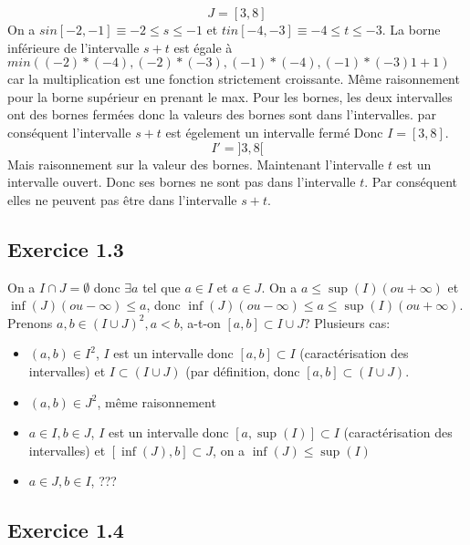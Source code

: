 \documentclass[]{book}
\theoremstyle{definition}
\begin{document}
$$J=[3,8]$$
On a $s in [-2,-1] \equiv -2 \leq s \leq -1$ et $t in [-4,-3] \equiv -4 \leq t \leq -3$. La borne inf\'erieure de l'intervalle $s+t$ est \'egale \`a $min((-2)*(-4), (-2)*(-3), (-1)*(-4), (-1)*(-3)1+1)$ car la multiplication est une fonction strictement croissante. M\^eme raisonnement pour la borne sup\'erieur en prenant le max. Pour les bornes, les deux intervalles ont des bornes ferm\'ees donc la valeurs des bornes sont dans l'intervalles. par cons\'equent l'intervalle $s+t$ est \'egelement un intervalle ferm\'e Donc $I = [3,8]$.    
$$I'= ]3,8[$$
Mais raisonnement sur la valeur des bornes. Maintenant l'intervalle $t$ est un intervalle ouvert. Donc ses bornes ne sont pas dans l'intervalle $t$. Par cons\'equent elles ne peuvent pas \^etre dans l'intervalle $s+t$. 


\subsection*{Exercice 1.3}

On a $I \cap J = \emptyset$ donc $\exists a$ tel que $a \in I$ et $a \in J$. On a $a \leq \sup(I) (ou +\infty)$ et $\inf(J) (ou -\infty) \leq a$, donc $\inf(J) (ou -\infty) \leq a \leq \sup(I) (ou +\infty)$.\\

Prenons $a,b \in (I \cup J)^2, a < b$, a-t-on $[a,b] \subset I \cup J$? 
Plusieurs cas:
\begin{itemize}
\item $(a,b) \in I^2$, $I$ est un intervalle donc $[a,b] \subset I$ (caract\'erisation des intervalles) et $I \subset (I \cup J)$ (par d\'efinition, donc $[a,b] \subset (I \cup J)$.
\item $(a,b) \in J^2$, m\^eme raisonnement 
\item $a \in I, b \in J$, $I$ est un intervalle donc $[a,\sup(I)] \subset I$ (caract\'erisation des intervalles) et $[\inf(J),b] \subset J$, on a $\inf(J) \leq \sup(I)$ 
\item $a \in J, b \in I$, ???
\end{itemize}


\subsection*{Exercice 1.4}
\end{document}
